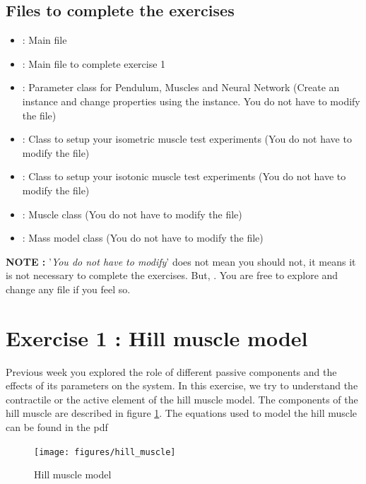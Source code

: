 \documentclass{cmc}
\begin{document}
\subsection*{Files to complete the exercises}
\label{sec:intro}

\begin{itemize}
\item {} : Main file
\item {} : Main file to complete exercise 1
\item {} : Parameter class for Pendulum,
  Muscles and Neural Network (Create an instance and change properties
  using the instance. You do not have to modify the file)
\item {} : Class to setup your isometric
  muscle test experiments (You do not have to modify the file)
\item {} : Class to setup your isotonic
  muscle test experiments (You do not have to modify the file)
\item {} : Muscle class (You do not have to modify
  the file)
\item {} : Mass model class (You do not have to modify
  the file)
\end{itemize}

\textbf{NOTE : } '\textit{You do not have to modify}' does not mean
you should not, it means it is not necessary to complete the
exercises. But, . You are free to explore
and change any file if you feel so.


\section*{Exercise 1 : Hill muscle model}
\label{sec:question-2}

Previous week you explored the role of different passive components
and the effects of its parameters on the system. In this exercise, we
try to understand the contractile or the active element of the hill
muscle model. The components of the hill muscle are described in
figure \ref{fig:hill_muscle}. The equations used to model the hill
muscle can be found in the pdf 

\begin{figure}[H]
  \centering \texttt{[image: figures/hill\_muscle]}
  \caption{Hill muscle model}
  \label{fig:hill_muscle}
\end{figure}
\end{document}
